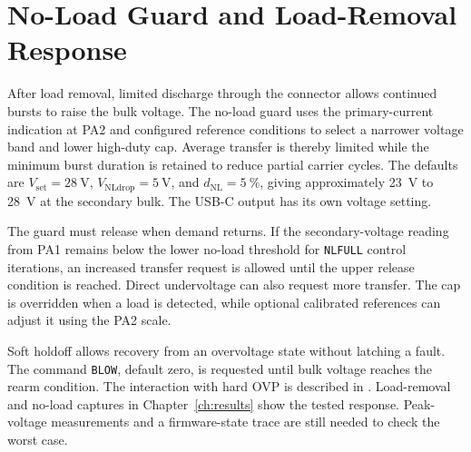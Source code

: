 \section{No-Load Guard and Load-Removal Response}
\label{sec:ctrl-open}

After load removal, limited discharge through the connector allows continued bursts to raise the bulk voltage. The no-load guard uses the primary-current indication at PA2 and configured reference conditions to select a narrower voltage band and lower high-duty cap. Average transfer is thereby limited while the minimum burst duration is retained to reduce partial carrier cycles. The defaults are \(V_{\mathrm{set}}=\SI{28}{\volt}\), \(V_{\mathrm{NLdrop}}=\SI{5}{\volt}\), and \(d_{\mathrm{NL}}=\SI{5}{\percent}\), giving approximately \SI{23}{\volt} to \SI{28}{\volt} at the secondary bulk. The USB-C output has its own voltage setting.

The guard must release when demand returns. If the secondary-voltage reading from PA1 remains below the lower no-load threshold for \texttt{NLFULL} control iterations, an increased transfer request is allowed until the upper release condition is reached. Direct undervoltage can also request more transfer. The cap is overridden when a load is detected, while optional calibrated references can adjust it using the PA2 scale.

Soft holdoff allows recovery from an overvoltage state without latching a fault. The command \texttt{BLOW}, default zero, is requested until bulk voltage reaches the rearm condition. The interaction with hard OVP is described in . Load-removal and no-load captures in Chapter~\ref{ch:results} show the tested response. Peak-voltage measurements and a firmware-state trace are still needed to check the worst case.
